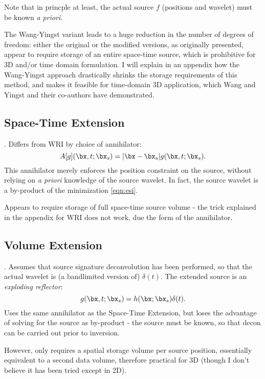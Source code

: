 Note that in princple at least, the actual source $f$ (positions and wavelet) must be known {\em a priori}.

The Wang-Yingst variant leads to a huge reduction in the number of degrees of freedom: either the original or the modified versions, as originally presented, appear to require storage of an entire space-time source, which is prohibitive for 3D and/or time domain formulation. I will explain in an appendix how the Wang-Yingst approach drastically shrinks the storage requirements of this method, and makes it feasible for time-domain 3D application, which Wang and Yingst and their co-authors have demonstrated.

\subsection{Space-Time Extension}
\cite{HuangSymes:SEG16b}. Differs from WRI by choice of annihilator:
\begin{equation}
\label{eqn:msste}
A[g](\bx,t;\bx_s) = |\bx-\bx_s|g(\bx,t;\bx_s).
\end{equation}
This annihilator merely enforces the position constraint on the source, without relying on {\em a priori} knowledge of the source wavelet. In fact, the source wavelet is a by-product of the minimization \ref{eqn:esi}.

Appears to require storage of full space-time source volume - the trick explained in the appendix for WRI does not work, due the form of the annihilator. 

\subsection{Volume Extension}
\cite{HuangSymes:SEG16a}. Assumes that source signature deconvolution has been performed, so that the actual wavelet is (a bandlimited version of) $\delta(t)$. The extended source is an {\em exploding reflector}:
\begin{equation}
\label{eqn:msvol}
g(\bx,t;\bx_s) = h(\bx;\bx_s)\delta(t).
\end{equation}
Uses the same annihilator as the Space-Time Extension, but loses the advantage of solving for the source as by-product - the source must be known, so that decon can be carried out prior to inversion. 

However, only requires a spatial storage volume per source position, essentially equivalent to a second data volume, therefore practical for 3D (though I don't believe it has been tried except in 2D).


